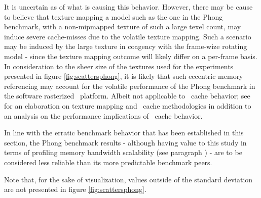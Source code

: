 It is uncertain as of what is causing this behavior.
However, there may be cause to believe that texture mapping a model such as the one in the Phong benchmark, with a non-mipmapped texture of such a large texel count, may induce severe cache-misses due to the volatile texture mapping.
Such a scenario may be induced by the large texture in coagency with the frame-wize rotating model - since the texture mapping outcome will likely differ on a per-frame basis.
In consideration to the sheer size of the textures used for the experiments presented in figure \ref{fig:scattersphong}, it is likely that such eccentric memory referencing may account for the volatile performance of the Phong benchmark in the software rasterized \dvttermsimics\ platform.
Albeit not applicable to \dvttermcpu\ cache behavior; see ~ for an elaboration on texture mapping and \dvttermgpu\ cache methodologies in addition to an analysis on the performance implications of \dvttermgpu\ cache behavior.

In line with the erratic benchmark behavior that has been established in this section, the Phong benchmark results - although having value to this study in terms of profiling memory bandwidth scalability (see paragraph ) - are to be considered less reliable than its more predictable benchmark peers.

\noindent
Note that, for the sake of visualization, values outside of the standard deviation are not presented in figure \ref{fig:scattersphong}.



